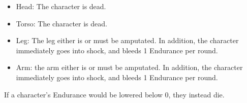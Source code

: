 \documentclass{article}
\begin{document}
\begin{itemize}[noitemsep,topsep=\mdcompacttopsep]%

\item{}Head: The character is dead. %

\item{}Torso: The character is dead. %

\item{}Leg: The leg either is or must be amputated. In addition, the character immediately goes into shock, and bleeds 1 Endurance per round. %

\item{}Arm: the arm either is or must be amputated. In addition, the character immediately goes into shock, and bleeds 1 Endurance per round. %
\end{itemize}%

\noindent{}If a character’s Endurance would be lowered below 0, they instead die.%
\end{document}
